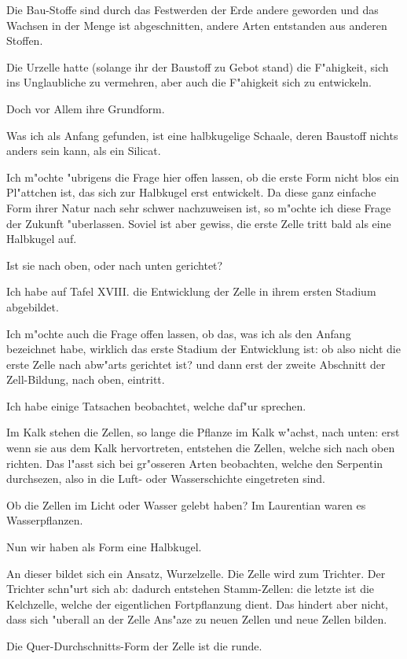 \documentclass[a4paper, 11pt, oneside, german]{article}
\begin{document}
Die Bau-Stoffe sind durch das Festwerden der Erde andere geworden und das Wachsen in der Menge ist abgeschnitten, andere Arten entstanden aus anderen Stoffen.

Die Urzelle hatte (solange ihr der Baustoff zu Gebot stand) die F"ahigkeit, sich ins Unglaubliche zu vermehren, aber auch die F"ahigkeit sich zu entwickeln.

Doch vor Allem ihre Grundform.

Was ich als Anfang gefunden, ist eine halbkugelige Schaale, deren Baustoff nichts anders sein kann, als ein Silicat.

Ich m"ochte "ubrigens die Frage hier offen lassen, ob die erste Form nicht blos ein Pl"attchen ist, das sich zur Halbkugel erst entwickelt. Da diese ganz einfache Form ihrer Natur nach sehr schwer nachzuweisen ist, so m"ochte ich diese Frage der Zukunft "uberlassen. Soviel ist aber gewiss, die erste Zelle tritt bald als eine Halbkugel auf.

Ist sie nach oben, oder nach unten gerichtet?

Ich habe auf Tafel XVIII. die Entwicklung der Zelle in ihrem ersten Stadium abgebildet.

Ich m"ochte auch die Frage offen lassen, ob das, was ich als den Anfang bezeichnet habe, wirklich das erste Stadium der Entwicklung ist: ob also nicht die erste Zelle nach abw"arts gerichtet ist? und dann erst der zweite Abschnitt der Zell-Bildung, nach oben, eintritt.

Ich habe einige Tatsachen beobachtet, welche daf"ur sprechen.

Im Kalk stehen die Zellen, so lange die Pflanze im Kalk w"achst, nach unten: erst wenn sie aus dem Kalk hervortreten, entstehen die Zellen, welche sich nach oben richten. Das l"asst sich bei gr"osseren Arten beobachten, welche den Serpentin durchsezen, also in die Luft- oder Wasserschichte eingetreten sind.

Ob die Zellen im Licht oder Wasser gelebt haben? Im Laurentian waren es Wasserpflanzen.

Nun wir haben als Form eine Halbkugel.

An dieser bildet sich ein Ansatz, Wurzelzelle. Die Zelle wird zum Trichter. Der Trichter schn"urt sich ab: dadurch entstehen Stamm-Zellen: die letzte ist die Kelchzelle, welche der eigentlichen Fortpflanzung dient. Das hindert aber nicht, dass sich "uberall an der Zelle Ans"aze zu neuen Zellen und neue Zellen bilden.

Die Quer-Durchschnitts-Form der Zelle ist die runde.
\end{document}
